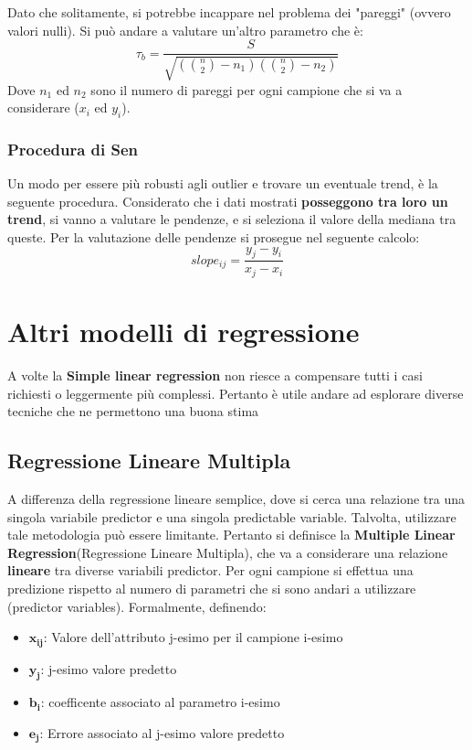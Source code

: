 Dato che solitamente, si potrebbe incappare nel problema dei "pareggi" (ovvero valori nulli). Si può andare a valutare un'altro parametro che è:
\[
\tau_b = \frac{S}{\sqrt{(\binom{n}{2} - n_1)(\binom{n}{2}-n_2)}}
\]
Dove \(n_1\) ed \(n_2\) sono il numero di pareggi per ogni campione che si va a considerare (\(x_i\) ed \(y_i\)).

\subsubsection{Procedura di Sen}
Un modo per essere più robusti agli outlier e trovare un eventuale trend, è la seguente procedura. Considerato che i dati mostrati \textbf{posseggono tra loro un trend}, si vanno a valutare le pendenze, e si seleziona il valore della mediana tra queste.
Per la valutazione delle pendenze si prosegue nel seguente calcolo:
\[
slope_{ij} = \frac{y_j - y_i}{x_j - x_i}
\]

\section{Altri modelli di regressione}
A volte la \textbf{Simple linear regression} non riesce a compensare tutti i casi richiesti o leggermente più complessi. Pertanto è utile andare ad esplorare diverse tecniche che ne permettono una buona stima

\subsection{Regressione Lineare Multipla}
A differenza della regressione lineare semplice, dove si cerca una relazione tra una singola variabile predictor e una singola predictable variable. Talvolta, utilizzare tale metodologia può essere limitante. Pertanto si definisce la \textbf{Multiple Linear Regression}(Regressione Lineare Multipla), che va a considerare una relazione \textbf{lineare} tra diverse variabili predictor. Per ogni campione si effettua una predizione rispetto al numero di parametri che si sono andari a utilizzare (predictor variables). Formalmente, definendo:
\begin{itemize}
    \item \(\mathbf{x_{ij}}\): Valore dell'attributo j-esimo per il campione i-esimo
    \item \(\mathbf{y_j}\): j-esimo valore predetto
    \item \(\mathbf{b_i}\): coefficente associato al parametro i-esimo
    \item \(\mathbf{e_j}\): Errore associato al j-esimo valore predetto
\end{itemize}

